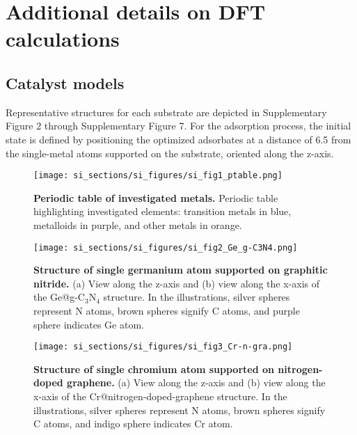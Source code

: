 

\newpage  %

\section{Additional details on DFT calculations}


\subsection{Catalyst models}


Representative structures for each substrate are depicted in Supplementary Figure 2 through Supplementary Figure 7. For the adsorption process, the initial state is defined by positioning the optimized adsorbates at a distance of 6.5 \text{\AA} from the single-metal atoms supported on the substrate, oriented along the z-axis.


\begin{figure}
  \centering
  \texttt{[image: si\_sections/si\_figures/si\_fig1\_ptable.png]}
  \caption{\textbf{Periodic table of investigated metals.}
  Periodic table highlighting investigated elements: transition metals in blue, metalloids in purple, and other metals in orange.}
  \label{si_fig1:shifting}
\end{figure}


\begin{figure}
  \centering
  \texttt{[image: si\_sections/si\_figures/si\_fig2\_Ge\_g-C3N4.png]}
  \caption{\textbf{Structure of single germanium atom supported on graphitic nitride.}
  (a) View along the z-axis and (b) view along the x-axis of the Ge@g-C$_3$N$_4$ structure.
  In the illustrations, silver spheres represent N atoms, brown spheres signify C atoms,
  and purple sphere indicates Ge atom.}
  \label{si_fig2:Ge_g-C3N4}
\end{figure}


\begin{figure}
  \centering
  \texttt{[image: si\_sections/si\_figures/si\_fig3\_Cr-n-gra.png]}
  \caption{\textbf{Structure of single chromium atom supported on nitrogen-doped graphene.}
  (a) View along the z-axis and (b) view along the x-axis of the Cr@nitrogen-doped-graphene structure.
  In the illustrations, silver spheres represent N atoms, brown spheres signify C atoms,
  and indigo sphere indicates Cr atom.}
  \label{si_fig3:Cr-n-gra}
\end{figure}


